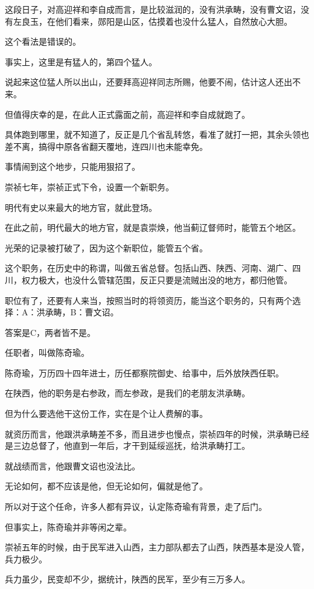 \begin{multicols}{\theparacolNo}
		这段日子，对高迎祥和李自成而言，是比较滋润的，没有洪承畴，没有曹文诏，没有左良玉，在他们看来，郧阳是山区，估摸着也没什么猛人，自然放心大胆。

		这个看法是错误的。

		事实上，这里是有猛人的，第四个猛人。

		说起来这位猛人所以出山，还要拜高迎祥同志所赐，他要不闹，估计这人还出不来。

		但值得庆幸的是，在此人正式露面之前，高迎祥和李自成就跑了。

		具体跑到哪里，就不知道了，反正是几个省乱转悠，看准了就打一把，其余头领也差不离，搞得中原各省翻天覆地，连四川也未能幸免。

		事情闹到这个地步，只能用狠招了。

		崇祯七年，崇祯正式下令，设置一个新职务。

		明代有史以来最大的地方官，就此登场。

		在此之前，明代最大的地方官，就是袁崇焕，他当蓟辽督师时，能管五个地区。

		光荣的记录被打破了，因为这个新职位，能管五个省。

		这个职务，在历史中的称谓，叫做五省总督。包括山西、陕西、河南、湖广、四川，权力极大，也没什么管辖范围，反正只要是流贼出没的地方，都归他管。

		职位有了，还要有人来当，按照当时的将领资历，能当这个职务的，只有两个选择：A：洪承畴，B：曹文诏。

		答案是C，两者皆不是。

		任职者，叫做陈奇瑜。

		陈奇瑜，万历四十四年进士，历任都察院御史、给事中，后外放陕西任职。

		在陕西，他的职务是右参政，而左参政，是我们的老朋友洪承畴。

		但为什么要选他干这份工作，实在是个让人费解的事。

		就资历而言，他跟洪承畴差不多，而且进步也慢点，崇祯四年的时候，洪承畴已经是三边总督了，他直到一年后，才干到延绥巡抚，给洪承畴打工。

		就战绩而言，他跟曹文诏也没法比。

		无论如何，都不应该是他，但无论如何，偏就是他了。

		所以对于这个任命，许多人都有异议，认定陈奇瑜有背景，走了后门。

		但事实上，陈奇瑜并非等闲之辈。

		崇祯五年的时候，由于民军进入山西，主力部队都去了山西，陕西基本是没人管，兵力极少。

		兵力虽少，民变却不少，据统计，陕西的民军，至少有三万多人。


\end{multicols}
